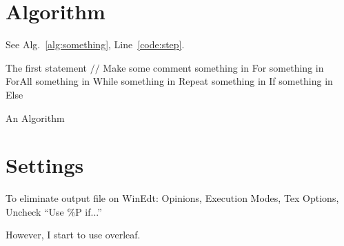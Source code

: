 \documentclass[a4paper]{article}
\begin{document}
\section{Algorithm}
See Alg.~\ref{alg:something}, Line~\ref{code:step}.

 \begin{algorithm}[!ht] %
  The first statement\;
  \label{code:step}
  $//$ Make some comment\;
  {something in For\;}  
  {something in ForAll\;}
  {something in While\;}
  {something in Repeat\;}
  {something in If\;}
  {something in Else\;}
  \caption{An Algorithm}
  \label{alg:something}
 \end{algorithm}

\section{Settings}
To eliminate output file on WinEdt:
Opinions, Execution Modes, Tex Options, Uncheck ``Use \%P if...''

\noindent However, I start to use overleaf. 


%
\end{document}
